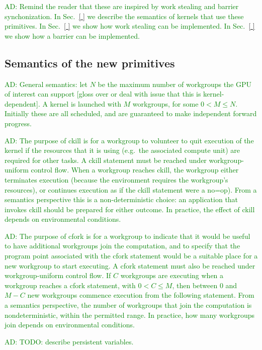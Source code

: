 \documentclass[nocopyrightspace]{sigplanconf-pldi16}
\newcommand{\ADComment}[1]{\textcolor{green}{AD: #1}}
\newcommand{\mysec}{Sec.~}
\begin{document}
\ADComment{Remind the reader that these are inspired by work stealing
  and barrier synchonization.  In \mysec\ref{ } we describe the
  semantics of kernels that use these primitives.  In \mysec\ref{ } we
  show how work stealing can be implemented.  In \mysec\ref{ } we show
  how a barrier can be implemented.}

\subsection{Semantics of the new primitives}

\ADComment{General semantics: let $N$ be the maximum number of
  workgroups the GPU of interest can support [gloss over or deal with
    issue that this is kernel-dependent].  A kernel is launched with
  $M$ workgroups, for some $0 < M \leq N$.  Initially these are all
  scheduled, and are guaranteed to make independent forward progress.}

\ADComment{The purpose of ckill is for a workgroup to volunteer to
  quit execution of the kernel if the resources that it is using
  (e.g.\ the associated compute unit) are required for other tasks.  A
  ckill statement must be reached under workgroup-uniform control
  flow.  When a workgroup reaches ckill, the workgroup either
  terminates execution (because the environment requires the
  workgroup's resources), or continues execution as if the ckill
  statement were a no=op).  From a semantics perspective this is a
  non-deterministic choice: an application that invokes ckill should
  be prepared for either outcome.  In practice, the effect of ckill
  depends on environmental conditions.}

\ADComment{The purpose of cfork is for a workgroup to indicate that it
  would be useful to have additional workgroups join the computation,
  and to specify that the program point associated with the cfork
  statement would be a suitable place for a new workgroup to start
  executing.  A cfork statement must also be reached under
  workgroup-uniform control flow.  If $C$ workgroups are executing
  when a workgroup reaches a cfork statement, with $0 < C \leq M$,
  then between 0 and $M-C$ new workgroups commence execution from the
  following statement.  From a semantics perspective, the number of
  workgroups that join the computation is nondeterministic, within the
  permitted range.  In practice, how many workgroups join depends on
  environmental conditions.}

\ADComment{TODO: describe persistent variables.}
\end{document}
